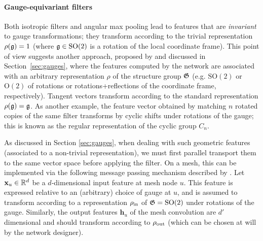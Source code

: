 \paragraph{Gauge-equivariant filters}
Both isotropic filters and angular max pooling lead to features that are {\em invariant} to gauge transformations; they transform according to the trivial representation $\rho({\mathfrak{g}}) = 1$ (where ${\mathfrak{g}} \in \mathrm{SO}(2)$ is a rotation of the local coordinate frame).
This point of view suggests another approach, proposed by  \cite{cohen2019gauge, deHaan2020gauge} and discussed in Section~\ref{sec:gauges}, where the features computed by the network are associated with an arbitrary representation $\rho$ of the structure group ${\mathfrak{G}}$ (e.g. $\mathrm{SO(2)}$ or $\mathrm{O(2)}$ of rotations or rotations+reflections of the coordinate frame, respectively). 
%
Tangent vectors transform according to the standard representation $\rho({\mathfrak{g}}) = {\mathfrak{g}}$.  
As another example, the feature vector obtained by matching $n$ rotated copies of the same filter transforms by cyclic shifts under rotations of the gauge; this is known as the regular representation of the cyclic group $C_n$.

As discussed in Section \ref{sec:gauges}, when dealing with such geometric features (associated to a non-trivial representation), we must first parallel transport them to the same vector space before applying the filter. %
%
On a mesh, this can be implemented via the following message passing mechanism described by  \cite{deHaan2020gauge}.
Let %
$\mathbf{x}_u \in \mathbb{R}^d$ be a $d$-dimensional input feature at mesh node $u$.
This feature is expressed relative to an (arbitrary) choice of gauge at $u$, and is assumed to transform according to a representation $\rho_{\textup{in}}$ of ${\mathfrak{G}} = \operatorname{SO}(2)$ under rotations of the gauge.
Similarly, the output features $\mathbf{h}_u$ 
of the mesh convolution are $d'$ dimensional and should transform according to $\rho_{\textup{out}}$ (which can be chosen at will by the network designer).



